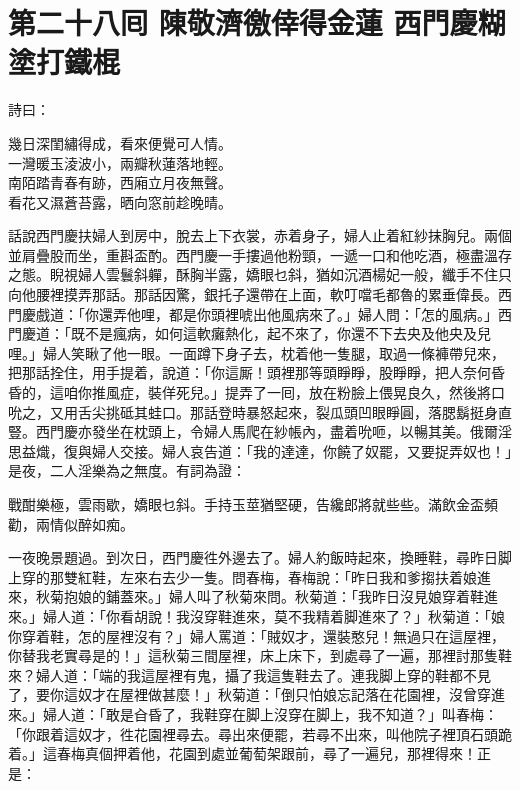 
\chapter*{第二十八囘 陳敬濟徼倖得金蓮 西門慶糊塗打鐵棍}


詩曰：

\begin{myquote}
幾日深閨繡得成，看來便覺可人情。\\一灣暖玉淩波小，兩瓣秋蓮落地輕。\\南陌踏青春有跡，西廂立月夜無聲。\\看花又濕蒼苔露，晒向窓前趁晚晴。
\end{myquote}

話說西門慶扶婦人到房中，脫去上下衣裳，赤着身子，婦人止着紅紗抹胸兒。{}兩個並肩疊股而坐，重斟盃酌。西門慶一手摟過他粉頸，一遞一口和他吃酒，極盡溫存之態。睨視婦人雲鬟斜軃，酥胸半露，嬌眼乜斜，猶如沉酒楊妃一般，{}纖手不住只向他腰裡摸弄那話。那話因驚，銀托子還帶在上面，軟叮噹毛都魯的累垂偉長。西門慶戲道：「你還弄他哩，都是你頭裡唬出他風病來了。」婦人問：「怎的風病。」西門慶道：「既不是瘋病，如何這軟癱熱化，起不來了，你還不下去央及他央及兒哩。」婦人笑瞅了他一眼。一面蹲下身子去，枕着他一隻腿，取過一條褲帶兒來，把那話拴住，用手提着，說道：「你這厮！頭裡那等頭睜睜，股睜睜，把人奈何昏昏的，這咱你推風症，裝佯死兒。」{}提弄了一囘，放在粉臉上偎晃良久，然後將口吮之，又用舌尖挑砥其蛙口。那話登時暴怒起來，裂瓜頭凹眼睜圓，落腮鬍挺身直豎。西門慶亦發坐在枕頭上，令婦人馬爬在紗帳內，盡着吮咂，以暢其美。俄爾淫思益熾，復與婦人交接。婦人哀告道：「我的達達，你饒了奴罷，又要捉弄奴也！」是夜，二人淫樂為之無度。有詞為證：

\begin{myquote}
戰酣樂極，雲雨歇，嬌眼乜斜。手持玉莖猶堅硬，告纔郎將就些些。滿飲金盃頻勸，兩情似醉如痴。
\end{myquote}

一夜晚景題過。到次日，西門慶徃外邊去了。婦人約飯時起來，換睡鞋，尋昨日脚上穿的那雙紅鞋，左來右去少一隻。問春梅，春梅說：「昨日我和爹搊扶着娘進來，秋菊抱娘的鋪蓋來。」婦人叫了秋菊來問。秋菊道：「我昨日沒見娘穿着鞋進來。」婦人道：「你看胡說！我沒穿鞋進來，莫不我精着脚進來了？」秋菊道：「娘你穿着鞋，怎的屋裡沒有？」{}婦人罵道：「賊奴才，還裝憨兒！無過只在這屋裡，你替我老實尋是的！」這秋菊三間屋裡，床上床下，到處尋了一遍，那裡討那隻鞋來？婦人道：「端的我這屋裡有鬼，攝了我這隻鞋去了。連我脚上穿的鞋都不見了，要你這奴才在屋裡做甚麼！」秋菊道：「倒只怕娘忘記落在花園裡，沒曾穿進來。」婦人道：「敢是㒲昏了，{}我鞋穿在脚上沒穿在脚上，我不知道？」叫春梅：「你跟着這奴才，徃花園裡尋去。尋出來便罷，若尋不出來，叫他院子裡頂石頭跪着。」這春梅真個押着他，花園到處並葡萄架跟前，尋了一遍兒，那裡得來！正是：

